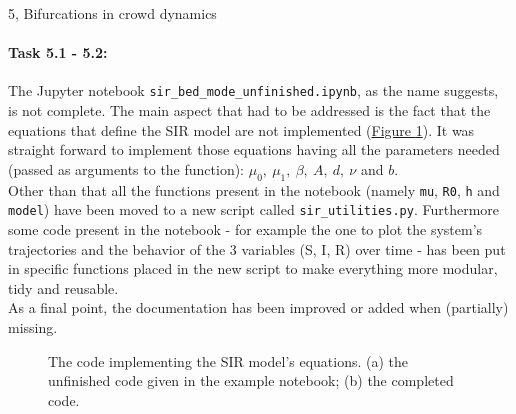 \documentclass[10pt,a4paper]{article}
\begin{document}
\begin{task}{5, Bifurcations in crowd dynamics}
\paragraph{Task 5.1 - 5.2:}
The Jupyter notebook \texttt{sir\_bed\_mode\_unfinished.ipynb}, as the name suggests, is not complete.
The main aspect that had to be addressed is the fact that the equations that define the SIR model are not implemented (\hyperref[fig:sir-eqq-code]{Figure \ref{fig:sir-eqq-code}}).
It was straight forward to implement those equations having all the parameters needed (passed as arguments to the function): $\mu_0,\ \mu_1,\ \beta,\ A,\ d,\ \nu$ and $b$.\\
Other than that all the functions present in the notebook (namely \texttt{mu}, \texttt{R0}, \texttt{h} and \texttt{model}) have been moved to a new script called \texttt{sir\_utilities.py}.
Furthermore some code present in the notebook - for example the one to plot the system's trajectories and the behavior of the 3 variables (S, I, R) over time - has been put in specific functions placed in the new script to make everything more modular, tidy and reusable.\\
As a final point, the documentation has been improved or added when (partially) missing.

\begin{figure}[H]
    \centering
    \hfill
    \caption{The code implementing the SIR model's equations. (a) the unfinished code given in the example notebook; (b) the completed code.}
    \label{fig:sir-eqq-code}
\end{figure}


\end{task}
\end{document}
